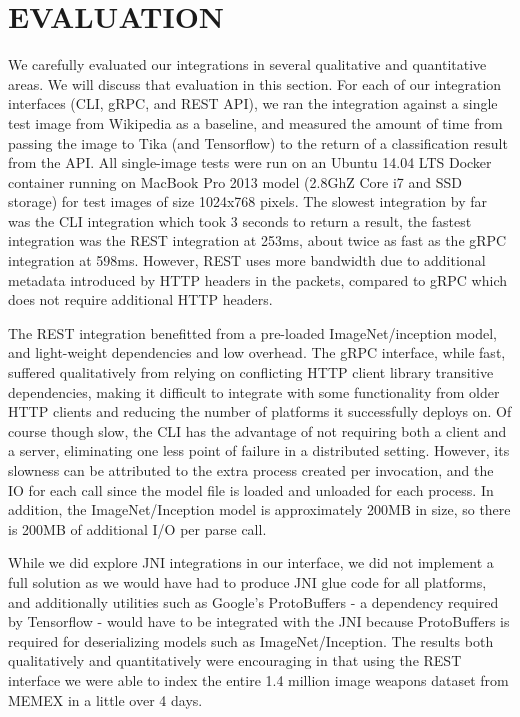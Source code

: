 \section {EVALUATION} \label{sec:evaluation}

We carefully evaluated our integrations in several qualitative and quantitative areas. We will discuss that evaluation in this section. For each of our integration interfaces (CLI, gRPC, and REST API), we ran the integration against a single test image from Wikipedia as a baseline, and measured the amount of time from passing the image to Tika (and Tensorflow) to the return of a classification result from the API. All single-image tests were run on an Ubuntu 14.04 LTS Docker container running on MacBook Pro 2013 model (2.8GhZ Core i7 and SSD storage) for test images of size 1024x768 pixels. The slowest integration by far was the CLI integration which took 3 seconds to return a result, the fastest integration was the REST integration at 253ms, about twice as fast as the gRPC integration at 598ms. However, REST uses more bandwidth due to additional metadata introduced by HTTP headers in the packets, compared to gRPC which does not require additional HTTP headers.

The REST integration benefitted from a pre-loaded ImageNet/inception model, and light-weight dependencies and low overhead. The gRPC interface, while fast, suffered qualitatively from relying on conflicting HTTP client library transitive dependencies, making it difficult to integrate with some functionality from older HTTP clients and reducing the number of platforms it successfully deploys on. Of course though slow, the CLI has the advantage of not requiring both a client and a server, eliminating one less point of failure in a distributed setting. However, its slowness can be attributed to the extra process created per invocation, and the IO for each call since the model file is loaded and unloaded for each process. In addition, the ImageNet/Inception model is approximately 200MB in size, so there is 200MB of additional I/O per parse call.

While we did explore JNI integrations in our interface, we did not implement a full solution as we would have had to produce JNI glue code for all platforms, and additionally utilities such as Google's ProtoBuffers - a dependency required by Tensorflow - would have to be integrated with the JNI because ProtoBuffers is required for deserializing models such as ImageNet/Inception\cite{javacpp-240}. The results both qualitatively and quantitatively were encouraging in that using the REST interface we were able to index the entire 1.4 million image weapons dataset from MEMEX in a little over 4 days.


